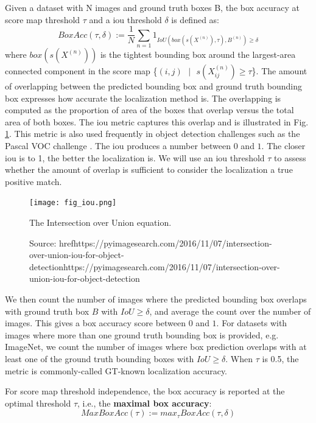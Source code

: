 Given a dataset with N images and ground truth boxes B, the box accuracy at score map threshold $\tau$ and a \acrshort{iou} threshold $\delta$ is defined as:
\begin{equation} \label{eq:boxacc}
    BoxAcc(\tau,\delta) := \frac{1}{N} \sum_{n=1}1_{IoU(box(s(X^{(n)}),\tau),B^{(n)})\ge\delta}
\end{equation}
where $box(s(X^{(n)}))$ is the tightest bounding box around the largest-area connected component in the score map \{$(i,j)\text{ }|\text{ }s(X^{(n)}_{ij}) \ge \tau$\}. The amount of overlapping between the predicted bounding box and ground truth bounding box expresses how accurate the localization method is. The overlapping is computed as the proportion of area of the boxes that overlap versus the total area of both boxes. The \acrfull{iou} metric captures this overlap and is illustrated in Fig. \ref{fig:iou}. This metric is also used frequently in object detection challenges such as the Pascal VOC challenge \cite{everingham2009pascal}. The \acrshort{iou} produces a number between $0$ and $1$. The closer \acrshort{iou} is to 1, the better the localization is. We will use an \acrshort{iou} threshold $\tau$ to assess whether the amount of overlap is sufficient to consider the localization a true positive match.
\begin{figure}[ht]
    \begin{center}       
    \texttt{[image: fig\_iou.png]}
    \caption[The IoU equation]{The Intersection over Union equation.}
    \caption*{Source: href{https://pyimagesearch.com/2016/11/07/intersection-over-union-iou-for-object-detection}{https://pyimagesearch.com/2016/11/07/intersection-over-union-iou-for-object-detection}}
    \label{fig:iou}
    \end{center}
\end{figure}

We then count the number of images where the predicted bounding box overlaps with ground truth box $B$ with $IoU \ge \delta$, and average the count over the number of images. This gives a box accuracy score between $0$ and $1$. For datasets with images where more than one ground truth bounding box is provided, e.g. ImageNet, we count the number of images where box prediction overlaps with at least one of the ground truth bounding boxes with $IoU \ge \delta$. When $\tau$ is 0.5, the metric is commonly-called GT-known localization accuracy. 

For score map threshold independence, the box accuracy is reported at the optimal threshold $\tau$, i.e., the \textbf{maximal box accuracy}:
\begin{equation}
    MaxBoxAcc(\tau) := max_{\tau} BoxAcc(\tau,\delta)
\end{equation}

